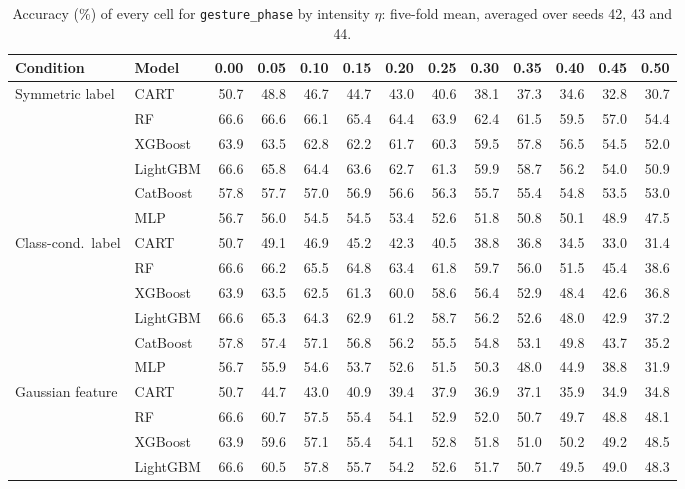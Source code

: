 \documentclass[pdflatex,sn-mathphys]{sn-jnl}
\theoremstyle{thmstyleone}
\begin{document}
\begin{table}[htbp]
\centering
\tiny
\setlength{\tabcolsep}{2.6pt}
\caption{Accuracy (\%) of every cell for \texttt{gesture\_phase} by intensity $\eta$: five-fold mean, averaged over seeds 42, 43 and 44.}
\label{tab:grid_gesture_phase}
\begin{tabular}{@{}llrrrrrrrrrrr@{}}
\toprule
Condition & Model & 0.00 & 0.05 & 0.10 & 0.15 & 0.20 & 0.25 & 0.30 & 0.35 & 0.40 & 0.45 & 0.50 \\
\midrule
Symmetric label & CART & 50.7 & 48.8 & 46.7 & 44.7 & 43.0 & 40.6 & 38.1 & 37.3 & 34.6 & 32.8 & 30.7 \\
 & RF & 66.6 & 66.6 & 66.1 & 65.4 & 64.4 & 63.9 & 62.4 & 61.5 & 59.5 & 57.0 & 54.4 \\
 & XGBoost & 63.9 & 63.5 & 62.8 & 62.2 & 61.7 & 60.3 & 59.5 & 57.8 & 56.5 & 54.5 & 52.0 \\
 & LightGBM & 66.6 & 65.8 & 64.4 & 63.6 & 62.7 & 61.3 & 59.9 & 58.7 & 56.2 & 54.0 & 50.9 \\
 & CatBoost & 57.8 & 57.7 & 57.0 & 56.9 & 56.6 & 56.3 & 55.7 & 55.4 & 54.8 & 53.5 & 53.0 \\
 & MLP & 56.7 & 56.0 & 54.5 & 54.5 & 53.4 & 52.6 & 51.8 & 50.8 & 50.1 & 48.9 & 47.5 \\
\midrule
Class-cond.\ label & CART & 50.7 & 49.1 & 46.9 & 45.2 & 42.3 & 40.5 & 38.8 & 36.8 & 34.5 & 33.0 & 31.4 \\
 & RF & 66.6 & 66.2 & 65.5 & 64.8 & 63.4 & 61.8 & 59.7 & 56.0 & 51.5 & 45.4 & 38.6 \\
 & XGBoost & 63.9 & 63.5 & 62.5 & 61.3 & 60.0 & 58.6 & 56.4 & 52.9 & 48.4 & 42.6 & 36.8 \\
 & LightGBM & 66.6 & 65.3 & 64.3 & 62.9 & 61.2 & 58.7 & 56.2 & 52.6 & 48.0 & 42.9 & 37.2 \\
 & CatBoost & 57.8 & 57.4 & 57.1 & 56.8 & 56.2 & 55.5 & 54.8 & 53.1 & 49.8 & 43.7 & 35.2 \\
 & MLP & 56.7 & 55.9 & 54.6 & 53.7 & 52.6 & 51.5 & 50.3 & 48.0 & 44.9 & 38.8 & 31.9 \\
\midrule
Gaussian feature & CART & 50.7 & 44.7 & 43.0 & 40.9 & 39.4 & 37.9 & 36.9 & 37.1 & 35.9 & 34.9 & 34.8 \\
 & RF & 66.6 & 60.7 & 57.5 & 55.4 & 54.1 & 52.9 & 52.0 & 50.7 & 49.7 & 48.8 & 48.1 \\
 & XGBoost & 63.9 & 59.6 & 57.1 & 55.4 & 54.1 & 52.8 & 51.8 & 51.0 & 50.2 & 49.2 & 48.5 \\
 & LightGBM & 66.6 & 60.5 & 57.8 & 55.7 & 54.2 & 52.6 & 51.7 & 50.7 & 49.5 & 49.0 & 48.3 \\

\end{tabular}
\end{table}
\end{document}
